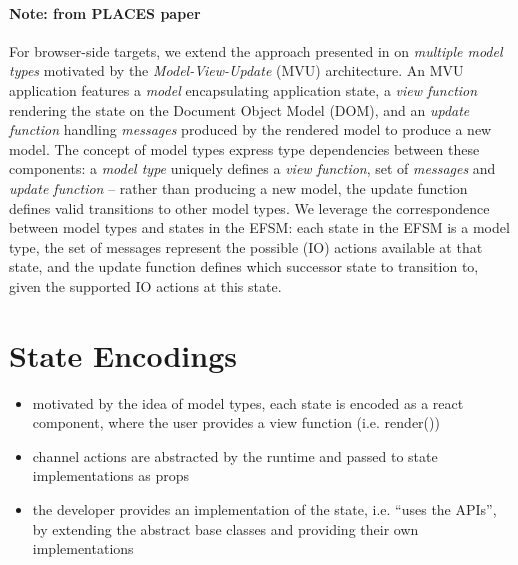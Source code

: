 \paragraph{Note: from PLACES paper}
For browser-side targets, we extend the approach presented in \cite{MVU2019} on
\textit{multiple model types} motivated by the \textit{Model-View-Update} (MVU)
architecture.
An MVU application features a \textit{model} encapsulating application
state, a \textit{view function} rendering the state on the Document Object Model (DOM), and an
\textit{update function} handling \textit{messages} produced by the
rendered model to produce a new model.
The concept of model types express type dependencies between these
components: a \emph{model type} uniquely defines a \textit{view function},
set of \textit{messages} and \textit{update function} -- rather than
producing a new model, the update function defines valid transitions to
other model types.
We leverage the correspondence between model types and states in the EFSM:
each state in the EFSM is a model type, the set of messages represent
the possible (IO) actions available at that state,
and the update function defines which successor state to transition to,
given the supported IO actions at this state.

\section{State Encodings}

\begin{itemize}
\item motivated by the idea of model types, each state is encoded as a react component, where the user provides a view function (i.e. render())
\item channel actions are abstracted by the runtime and passed to state implementations as props
\item the developer provides an implementation of the state, i.e. ``uses the APIs'', by extending the abstract base classes and providing their own implementations
\end{itemize}

